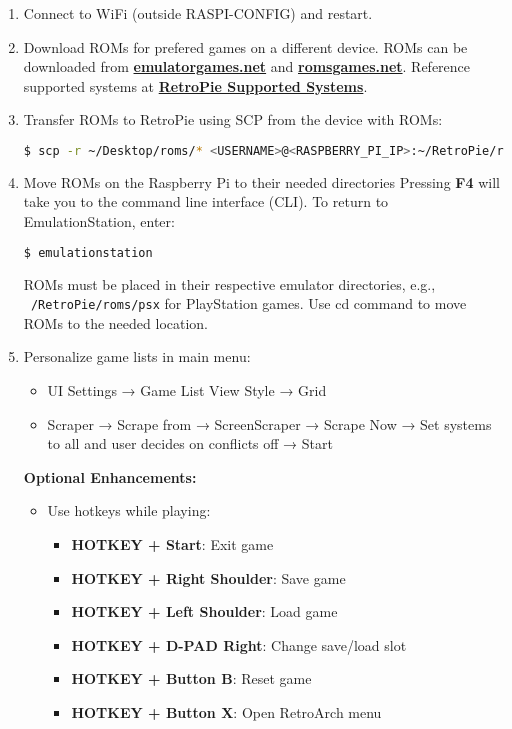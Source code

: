 \begin{enumerate}
\item Connect to WiFi (outside RASPI-CONFIG) and restart.

\item Download ROMs for prefered games on a different device. ROMs can be downloaded from \href{https://www.emulatorgames.net}{\textbf{\color{blue}emulatorgames.net}} and \href{https://www.romsgames.net}{\textbf{\color{blue}romsgames.net}}. Reference supported systems at \href{https://retropie.org.uk/docs/Supported-Systems/}{\textbf{\color{blue}RetroPie Supported Systems}}.

\item Transfer ROMs to RetroPie using SCP from the device with ROMs:
\begin{lstlisting}[language=bash, breaklines=true, breakatwhitespace=true, columns=fullflexible]
$ scp -r ~/Desktop/roms/* <USERNAME>@<RASPBERRY_PI_IP>:~/RetroPie/roms/
\end{lstlisting}
    
\item Move ROMs on the Raspberry Pi to their needed directories
Pressing \textbf{F4} will take you to the command line interface (CLI). To return to EmulationStation, enter:
\begin{lstlisting}[language=bash, breaklines=true, breakatwhitespace=true, columns=fullflexible]
$ emulationstation
\end{lstlisting}
ROMs must be placed in their respective emulator directories, e.g., \texttt{~/RetroPie/roms/psx} for PlayStation games. Use cd command to move ROMs to the needed location.

\item Personalize game lists in main menu:
\begin{itemize}
\item UI Settings → Game List View Style → Grid
\item Scraper → Scrape from → ScreenScraper → Scrape Now → Set systems to all and user decides on conflicts off → Start
\end{itemize}
 
\noindent \textbf{Optional Enhancements:}
\begin{itemize}

\item Use hotkeys while playing:
\begin{itemize}
\item \textbf{HOTKEY + Start}: Exit game
\item \textbf{HOTKEY + Right Shoulder}: Save game
\item \textbf{HOTKEY + Left Shoulder}: Load game
\item \textbf{HOTKEY + D-PAD Right}: Change save/load slot
\item \textbf{HOTKEY + Button B}: Reset game
\item \textbf{HOTKEY + Button X}: Open RetroArch menu
\end{itemize}


\end{itemize}
\end{enumerate}
